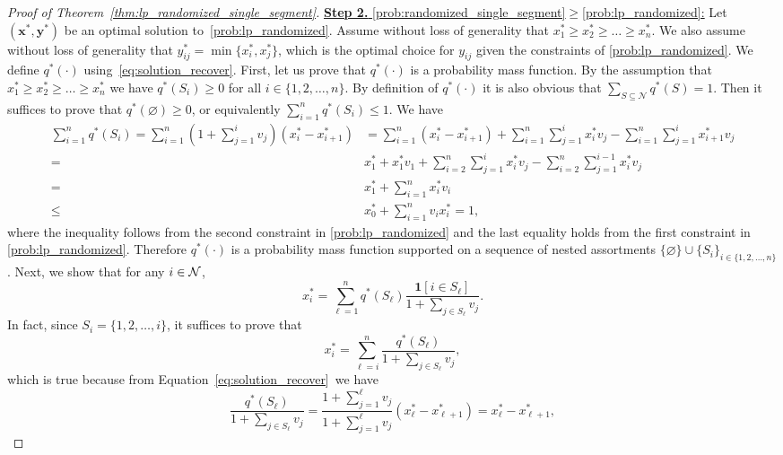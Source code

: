 \documentclass[msom,non-blindrev]{informs3} %
\theoremstyle{definition}
\begin{document}
\begin{proof}[Proof of Theorem~\ref{thm:lp_randomized_single_segment}]
\underline{\textbf{Step 2.} \eqref{prob:randomized_single_segment}$\geq$\eqref{prob:lp_randomized}:} Let $(\mathbf{x}^*,\mathbf{y}^*)$ be an optimal solution to~\eqref{prob:lp_randomized}. Assume without loss of generality that $x^*_1\geq x^*_2\geq\dots\geq x^*_n$.  We  also assume without loss of generality that $y^*_{ij}=\min\{x^*_i,x^*_j\}$, which is the optimal choice for $y_{ij}$ given the constraints of \eqref{prob:lp_randomized}.
 We define $q^*(\cdot)$ using~\eqref{eq:solution_recover}. First, let us prove that $q^*(\cdot)$ is a probability mass function. By the assumption that $x^*_1\geq x^*_2\geq \dots\geq x^*_n$ we have $q^*(S_i)\geq 0$ for all $i\in\{1,2,\dots,n\}$. By definition of $q^*(\cdot)$ it is also obvious that $\sum_{S\subseteq\mathcal{N}}q^*(S)=1$. Then it suffices to prove that $q^*(\varnothing)\geq 0$, or equivalently $\sum_{i=1}^n q^*(S_i)\leq 1$. We have
\begin{align*}
\sum_{i=1}^n q^*(S_i)=\sum_{i=1}^n \left(1+\sum_{j=1}^i v_j\right)(x^*_i-x^*_{i+1}) &=\sum_{i=1}^n(x^*_i-x^*_{i+1})+\sum_{i=1}^n\sum_{j=1}^i x^*_iv_j-\sum_{i=1}^n\sum_{j=1}^i x^*_{i+1}v_j\\
=&x^*_1+ x^*_1v_1+ \sum_{i=2}^n\sum_{j=1}^i x^*_iv_j-\sum_{i=2}^n\sum_{j=1}^{i-1}x^*_iv_j\\
=&x^*_1+  \sum_{i=1}^n x^*_iv_i \\
\leq & x^*_0+\sum_{i=1}^n v_ix^*_i=1,
\end{align*}
where the inequality follows from the second constraint in \eqref{prob:lp_randomized} and the last equality holds from the first constraint in \eqref{prob:lp_randomized}.
Therefore $q^*(\cdot)$ is a probability mass function supported on a sequence of nested assortments \mbox{$\{\varnothing\}\cup\{S_i\}_{i\in\{1,2,\dots,n\}}$}. Next, we show that for any $i \in \cal{N}$,
\begin{equation*}
x^*_i=\sum_{\ell=1}^n q^*(S_\ell)\dfrac{\bm{1}[i\in S_\ell]}{1+\sum_{j\in S_\ell}v_j}.
\end{equation*}
In fact, since $S_i=\{1,2,\dots,i\}$, it suffices to prove that
\begin{equation*}
x^*_i=\sum_{\ell=i}^n \dfrac{q^*(S_\ell)}{1+\sum_{j\in S_\ell}v_j},
\end{equation*}
which is true because from Equation~\eqref{eq:solution_recover}~we have
\begin{equation*}
\dfrac{q^*(S_\ell)}{1+\sum_{j\in S_\ell}v_j}=\dfrac{1+\sum_{j=1}^\ell v_j}{1+\sum_{j=1}^\ell v_j}(x^*_\ell-x^*_{\ell+1})=x^*_\ell-x^*_{\ell+1},

\end{equation*}
\end{proof}
\end{document}
